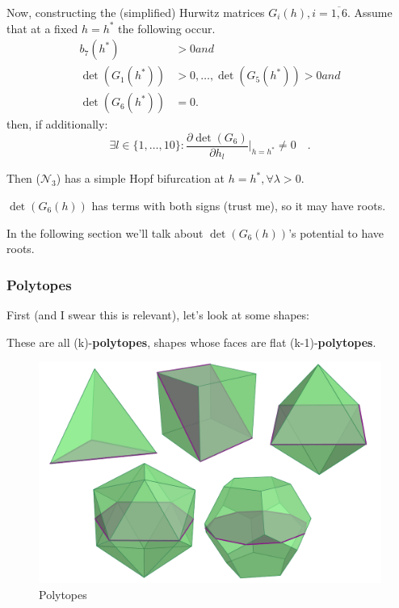 \documentclass[aspectratio=169]{beamer}
\begin{document}
\begin{frame}
	Now, constructing the (simplified) Hurwitz matrices $G_i(h), i = \overline{1,6}$. Assume that at a fixed $h = h^*$ the following occur.
	\[
		\begin{aligned}b_{7}(h^{*})&>0and\\\det(G_1(h^*))&>0,\ldots,\det(G_5(h^*))>0and\\\det(G_6(h^*))&=0.
		\end{aligned}
	\]
	then, if additionally:
	\[
		\exists l\in\{1,\ldots,10\} : \frac{\partial\det(G_6)}{\partial h_l}|_{h=h^*}\neq0\quad.
	\]

	Then ($\mathcal{N}_3$) has a simple Hopf bifurcation at $h = h^*, \forall \lambda > 0$.

	$\det(G_6(h))$ has terms with both signs (trust me), so it may have roots.

	In the following section we'll talk about $\det(G_6(h))$'s potential to have roots.
\end{frame}

\begin{frame}
	\frametitle{Polytopes}
	First (and I swear this is relevant), let's look at some shapes:

	These are all (k)-\textbf{polytopes}, shapes whose faces are flat (k-1)-\textbf{polytopes}.
	\begin{figure}[H]
		\centering
		\includegraphics[width=0.5\linewidth]{pics/polytopes.png}
		\caption{Polytopes}
	\end{figure}
\end{frame}
\end{document}
